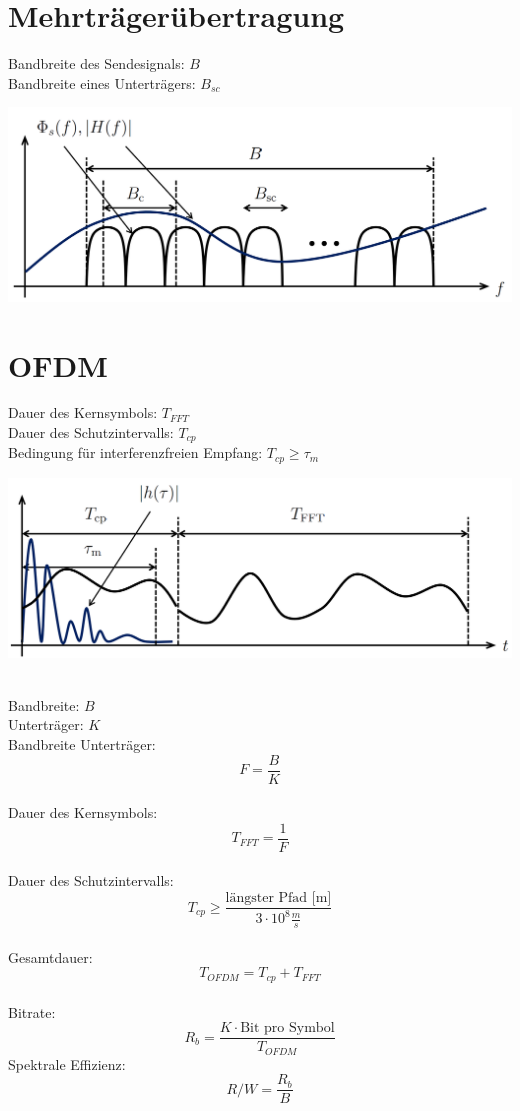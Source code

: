 \section{Mehrträgerübertragung}
Bandbreite des Sendesignals: $B$\\
Bandbreite eines Unterträgers: $B_{sc}$

\begin{center}
	\includegraphics[width=.9\textwidth]{../fig/mehrtrager.png}
\end{center}

\section{OFDM}
Dauer des Kernsymbols: $T_{FFT}$ \\
Dauer des Schutzintervalls: $T_{cp}$ \\
Bedingung für interferenzfreien Empfang: $T_{cp} \geq \tau_m$
\begin{center}
	\includegraphics[width=.9\textwidth]{../fig/ofdm.png}
\end{center}
~\\
Bandbreite: $B$ \\
Unterträger: $K$ \\
Bandbreite Unterträger:
\[
	F = \frac{B}{K}
\]
~\\
Dauer des Kernsymbols:
\[
	T_{FFT} = \frac{1}{F}
\]
~\\
Dauer des Schutzintervalls:
\[
	T_{cp} \geq \frac{\textrm{längster Pfad [m]}}{3\cdot 10^8 \frac{m}{s}}
\]
~\\
Gesamtdauer:
\[
	T_{OFDM} = T_{cp} + T_{FFT}
\]
~\\
Bitrate:
\[ 
	R_b = \frac{K \cdot \textrm{Bit pro Symbol}}{T_{OFDM}}
\]
Spektrale Effizienz:
\[
	R/W = \frac{R_b}{B}
\]
